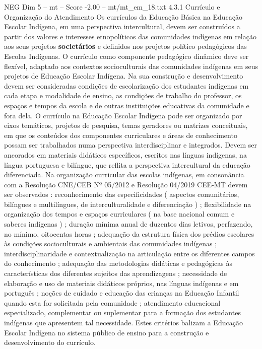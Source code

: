 \begin{textsample}{NEG Dim 5 – mt – Score -2.00 – mt/mt\_em\_18.txt}  \label{ex:f5_neg_202}
4.3.1 Currículo e Organização do Atendimento Os currículos da Educação Básica na Educação Escolar Indígena, em uma perspectiva intercultural, devem ser construídos a partir dos valores e interesses etnopolíticos das comunidades indígenas em relação aos seus projetos \textbf{societários} e definidos nos projetos político pedagógicos das Escolas Indígenas.
O currículo como componente pedagógico dinâmico deve ser flexível, adaptado aos contextos socioculturais das comunidades indígenas em seus projetos de Educação Escolar Indígena.
Na sua construção e desenvolvimento devem ser consideradas condições de escolarização dos estudantes indígenas em cada etapa e modalidade de ensino, as condições de trabalho do professor, os espaços e tempos da escola e de outras instituições educativas da comunidade e fora dela.
O currículo na Educação Escolar Indígena pode ser organizado por eixos temáticos, projetos de pesquisa, temas geradores ou matrizes conceituais, em que os conteúdos dos componentes curriculares e áreas de conhecimento possam ser trabalhados numa perspectiva interdisciplinar e integrados.
Devem ser ancorados em materiais didáticos específicos, escritos nas línguas indígenas, na língua portuguesa e bilíngue, que reflita a perspectiva intercultural da educação diferenciada.
Na organização curricular das escolas indígenas, em consonância com a Resolução CNE/CEB Nº 05/2012 e Resolução 04/2019 CEE-MT devem ser observados : reconhecimento das especificidades ( aspectos comunitários, bilíngues e multilíngues, de interculturalidade e diferenciação ) ; flexibilidade na organização dos tempos e espaços curriculares ( na base nacional comum e saberes indígenas ) ; duração mínima anual de duzentos dias letivos, perfazendo, no mínimo, oitocentas horas ; adequação da estrutura física dos prédios escolares às condições socioculturais e ambientais das comunidades indígenas ; interdisciplinaridade e contextualização na articulação entre os diferentes campos do conhecimento ; adequação das metodologias didáticas e pedagógicas às características dos diferentes sujeitos das aprendizagens ; necessidade de elaboração e uso de materiais didáticos próprios, nas línguas indígenas e em português ; noções de cuidado e educação das crianças na Educação Infantil quando esta for solicitada pela comunidade ; atendimento educacional especializado, complementar ou suplementar para a formação dos estudantes indígenas que apresentem tal necessidade.
Estes critérios balizam a Educação Escolar Indígena no sistema público de ensino para a construção e desenvolvimento do currículo.

\end{textsample}
